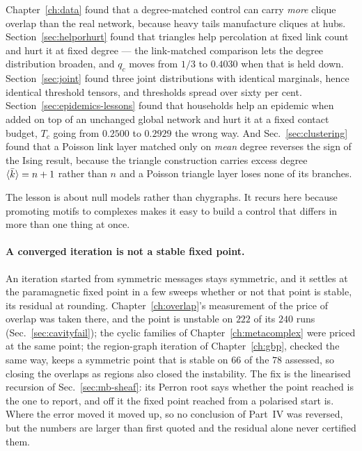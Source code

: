 Chapter~\ref{ch:data} found that a degree-matched control can carry \emph{more}
clique overlap than the real network, because heavy tails manufacture cliques at
hubs. Section~\ref{sec:helporhurt} found that triangles help percolation at
fixed link count and hurt it at fixed degree --- the link-matched comparison
lets the degree distribution broaden, and $q_{c}$ moves from $1/3$ to $0.4030$
when that is held down. Section~\ref{sec:joint} found three joint distributions
with identical marginals, hence identical threshold tensors, and thresholds
spread over sixty per cent. Section~\ref{sec:epidemics-lessons} found that
households help an epidemic when added on top of an unchanged global network and
hurt it at a fixed contact budget, $T_{c}$ going from $0.2500$ to $0.2929$ the
wrong way. And Sec.~\ref{sec:clustering} found that a Poisson link layer matched
only on \emph{mean} degree reverses the sign of the Ising result, because the
triangle construction carries excess degree $\langle \bar k \rangle=n+1$ rather than $n$
and a Poisson triangle layer loses none of its branches.

The lesson is about null models rather than chygraphs. It recurs here because
promoting motifs to complexes makes it easy to build a control that differs in
more than one thing at once.

\paragraph{A converged iteration is not a stable fixed point.} An
iteration started from symmetric messages stays symmetric, and it settles
at the paramagnetic fixed point in a few sweeps whether or not that point
is stable, its residual at rounding. Chapter~\ref{ch:overlap}'s
measurement of the price of overlap was taken there, and the point is
unstable on $222$ of its $240$ runs (Sec.~\ref{sec:cavityfail}); the
cyclic families of Chapter~\ref{ch:metacomplex} were priced at the same
point; the region-graph iteration of Chapter~\ref{ch:gbp}, checked the same
way, keeps a symmetric point that is stable on $66$ of the $78$ assessed,
so closing the overlaps as regions also closed the instability. The fix is
the linearised recursion of Sec.~\ref{sec:mb-sheaf}: its
Perron root says whether the point reached is the one to report, and off
it the fixed point reached from a polarised start is. Where the error
moved it moved up, so no conclusion of Part~IV was reversed, but the
numbers are larger than first quoted and the residual alone never
certified them.

